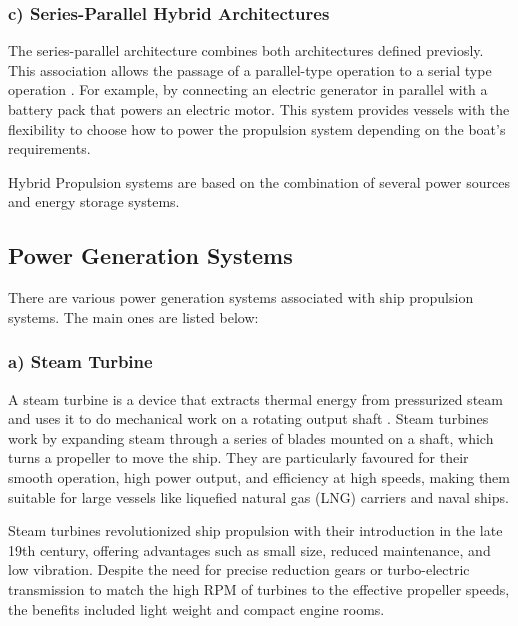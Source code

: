 \subsubsection{c) Series-Parallel Hybrid Architectures} \label{sec:SP_Hyb}
The series-parallel architecture combines both architectures defined previosly. This association allows the passage of a parallel-type operation to a serial type operation \cite{Bennabi}. For example, by connecting an electric generator in parallel with a battery pack that powers an electric motor. This system provides vessels with the flexibility to choose how to power the propulsion system depending on the boat's requirements.

Hybrid Propulsion systems are based on the combination of several power sources and energy storage systems.

\subsection{Power Generation Systems}

There are various power generation systems associated with ship propulsion systems. The main ones are listed below:

\subsubsection{a) Steam Turbine}
A steam turbine is a device that extracts thermal energy from pressurized steam and uses it to do mechanical work on a rotating output shaft \cite{Wartsila} \cite{MaritimeEduc}. Steam turbines work by expanding steam through a series of blades mounted on a shaft, which turns a propeller to move the ship. They are particularly favoured for their smooth operation, high power output, and efficiency at high speeds, making them suitable for large vessels like liquefied natural gas (LNG) carriers and naval ships. 

Steam turbines revolutionized ship propulsion with their introduction in the late 19th century, offering advantages such as small size, reduced maintenance, and low vibration. Despite the need for precise reduction gears or turbo-electric transmission to match the high RPM of turbines to the effective propeller speeds, the benefits included light weight and compact engine rooms.

